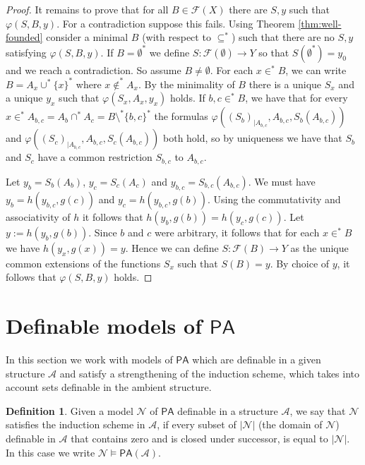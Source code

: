 \documentclass{amsart}
\newcommand{\ca}{\mathcal}
\newcommand{\nin}{\not \in}
\theoremstyle{plain}
\theoremstyle{definition}
\newtheorem{defn}[thm]{Definition}
\newcommand{\ins}{\in^*}
\newcommand{\F}{\mathcal{F}}
\newcommand{\PA}{\mathsf{PA}}
\begin{document}
\begin{proof}
It remains to prove that for all $B\in \F(X)$ there are $S,y$ such that $\varphi(S,B,y)$. For a contradiction suppose this fails. Using Theorem \ref{thm:well-founded} consider a minimal $B$ (with respect to $\subseteq^*$)  such that there are no $S,y$ satisfying $\varphi(S,B,y)$. If $B= \emptyset^*$ we define $S: {\F(\emptyset)} \to Y$ so that $S(\emptyset^*) = y_0$ and we reach a contradiction. So assume $B\neq \emptyset$. For each $x\ins B$, we can write $B = A_x \cup^* \{x\}^*$ where $x\nin^* A_x$. By the minimality of $B$ there is a unique $S_x$ and a unique $y_x$ such that $\varphi(S_x, A_x, y_x)$ holds. 
If $b,c\ins B$, we have that for every $x \ins A_{b,c} = A_b \cap^* A_c  = B\setminus^* \{b,c\}^*$ the formulas $\varphi((S_b)_{|A_{b,c}}, A_{b,c},S_b(A_{b,c}))$ and $\varphi((S_c)_{|A_{b,c}}, A_{b,c},S_c(A_{b,c}))$ both hold, so by uniqueness we have that $S_b$ and $S_c$ have a common restriction $S_{b,c}$ to $A_{b,c}$.

  Let $y_b = S_b(A_b)$, $y_c = S_c(A_c)$ and $y_{b,c} = S_{b,c}(A_{b,c})$. We must have $y_{b} = h(y_{b,c}, g(c))$ and $y_{c} = h(y_{b,c},g(b))$. Using the commutativity and associativity of $h$ it follows that $h(y_b, g(b)) = h(y_c, g(c))$. Let $y:=h(y_b,g(b))$. Since $b$ and $c$ were arbitrary, it follows that for each $x \ins B$ we have $h(y_x,g(x))=y$. Hence we can define $S:\F(B) \to Y$ as the unique common extensions of the functions $S_x$ such that $S(B)=y$. By choice of $y$, it follows that $\varphi(S, B, y)$ holds. 
\end{proof}

\section{Definable models of $\PA$}\label{sec:PA0}

In this section we work with models of $\PA$ which are definable in a given structure $\ca A$ and satisfy a strengthening of the induction scheme, which takes into account sets definable in the ambient structure. 

\begin{defn}\label{defn:PAA}
    Given a model $\ca N$ of $\PA$ definable in a structure $\ca A$, we say that $\ca N$ satisfies the induction scheme in $\ca A$, if every subset of $|\ca N|$ (the domain of $\ca N$) definable in $\ca A$ that contains zero and is closed under successor, is equal to $|\ca N|$. In this case we write $\ca N \models \PA(\ca A)$.
\end{defn}
\end{document}

